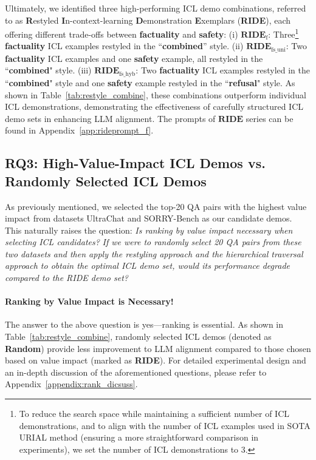 Ultimately, we identified three high-performing ICL demo combinations, referred to as \textbf{R}estyled \textbf{I}n-context-learning \textbf{D}emonstration \textbf{E}xemplars (\textbf{RIDE}), each offering different trade-offs between \textbf{\color{myblue} factuality} and \textbf{\color{myred} safety}:
(i) $\textbf{RIDE}_{\text{f}}$: Three\footnote{To reduce the search space while maintaining a sufficient number of ICL demonstrations, and to align with the number of ICL examples used in SOTA URIAL method (ensuring a more straightforward comparison in experiments), we set the number of ICL demonstrations to 3.} \textbf{\color{myblue} factuality} ICL examples restyled in the ``\textbf{combined}'' style.
(ii) $\textbf{RIDE}_{\text{fs\_uni}}$: Two \textbf{\color{myblue} factuality} ICL examples and one \textbf{\color{myred} safety} example, all restyled in the ``\textbf{combined}" style.
(iii) $\textbf{RIDE}_{\text{fs\_hyb}}$: Two \textbf{\color{myblue} factuality} ICL examples restyled in the ``\textbf{combined}" style and one \textbf{\color{myred} safety} example restyled in the ``\textbf{refusal}" style.
As shown in Table~\ref{tab:restyle_combine}, these combinations outperform individual ICL demonstrations, demonstrating the effectiveness of carefully structured ICL demo sets in enhancing LLM alignment.
The prompts of $\textbf{RIDE}$ series can be found in Appendix~\ref{app:rideprompt_f}.



\subsection*{RQ3: High-Value-Impact ICL Demos vs. Randomly Selected ICL Demos}
\label{ssec:random_icl}
As previously mentioned, we selected the top-20 QA pairs with the highest value impact from datasets UltraChat and SORRY-Bench as our candidate demos. 
This naturally raises the question: \textit{Is ranking by value impact necessary when selecting ICL candidates?} \textit{If we were to randomly select 20 QA pairs from these two datasets and then apply the restyling approach and the hierarchical traversal approach to obtain the optimal ICL demo set, would its performance degrade compared to the RIDE demo set?}

\paragraph{Ranking by Value Impact is Necessary!} The answer to the above question is yes—ranking is essential. As shown in Table~\ref{tab:restyle_combine}, randomly selected ICL demos (denoted as \textbf{Random}) provide less improvement to LLM alignment compared to those chosen based on value impact (marked as \textbf{RIDE}).
For detailed experimental design and an in-depth discussion of the aforementioned questions, please refer to Appendix~\ref{appendix:rank_dicsuss}.

